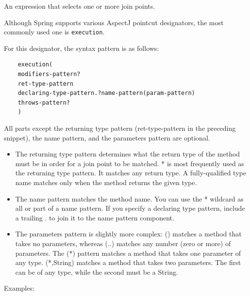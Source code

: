 \documentclass{scrartcl}
\begin{document}
An expression that selects one or more join points.

Although Spring supports various AspectJ pointcut designators, the most commonly used one is \lstinline{execution}.

For this designator, the syntax pattern is as follows:

\begin{lstlisting}
    execution(
    modifiers-pattern?
    ret-type-pattern
    declaring-type-pattern.?name-pattern(param-pattern)
    throws-pattern?
    )
\end{lstlisting}

All parts except the returning type pattern (ret-type-pattern in the preceding snippet), the name pattern, and the parameters pattern are optional.

\begin{itemize}
    \item The returning type pattern determines what the return type of the method must be in order for a join point to be matched. * is most frequently used as the returning type pattern. It matches any return type. A fully-qualified type name matches only when the method returns the given type.
    \item  The name pattern matches the method name. You can use the * wildcard as all or part of a name pattern. If you specify a declaring type pattern, include a trailing . to join it to the name pattern component.
    \item The parameters pattern is slightly more complex: () matches a method that takes no parameters, whereas (..) matches any number (zero or more) of parameters. The (*) pattern matches a method that takes one parameter of any type. (*,String) matches a method that takes two parameters. The first can be of any type, while the second must be a String.

\end{itemize}

Examples:
\end{document}
